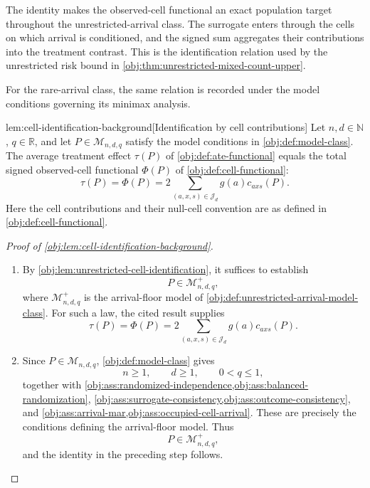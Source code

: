 \documentclass[11pt]{article}
\begin{document}
The identity makes the observed-cell functional an exact population target throughout the unrestricted-arrival class. The surrogate enters through the cells on which arrival is conditioned, and the signed sum aggregates their contributions into the treatment contrast. This is the identification relation used by the unrestricted risk bound in \cref{obj:thm:unrestricted-mixed-count-upper}.

For the rare-arrival class, the same relation is recorded under the model conditions governing its minimax analysis.

\begin{lemmav}{lem:cell-identification-background}[Identification by cell contributions]
Let \(n,d\in\mathbb N\), \(q\in\mathbb R\), and let \(P\in\mathcal M_{n,d,q}\) satisfy the model conditions in \cref{obj:def:model-class}. The average treatment effect \(\tau(P)\) of \cref{obj:def:ate-functional} equals the total signed observed-cell functional \(\Phi(P)\) of \cref{obj:def:cell-functional}:
\[
\tau(P)=\Phi(P)
=2\sum_{(a,x,s)\in\mathcal J_d}g(a)c_{axs}(P).
\]
Here the cell contributions and their null-cell convention are as defined in \cref{obj:def:cell-functional}.
\end{lemmav}

\begin{proof}[Proof of \cref{obj:lem:cell-identification-background}]
\begin{enumerate}
\item By \cref{obj:lem:unrestricted-cell-identification}, it suffices to establish
\[
P\in\mathcal M^{+}_{n,d,q},
\]
where \(\mathcal M^{+}_{n,d,q}\) is the arrival-floor model of \cref{obj:def:unrestricted-arrival-model-class}. For such a law, the cited result supplies
\[
\tau(P)=\Phi(P)
=2\sum_{(a,x,s)\in\mathcal J_d}g(a)c_{axs}(P).
\]

\item Since \(P\in\mathcal M_{n,d,q}\), \cref{obj:def:model-class} gives
\[
n\ge1,\qquad d\ge1,\qquad 0<q\le1,
\]
together with
\cref{obj:ass:randomized-independence,obj:ass:balanced-randomization},
\cref{obj:ass:surrogate-consistency,obj:ass:outcome-consistency}, and
\cref{obj:ass:arrival-mar,obj:ass:occupied-cell-arrival}.
These are precisely the conditions defining the arrival-floor model. Thus
\[
P\in\mathcal M^{+}_{n,d,q},
\]
and the identity in the preceding step follows.
\end{enumerate}
\end{proof}
\end{document}
